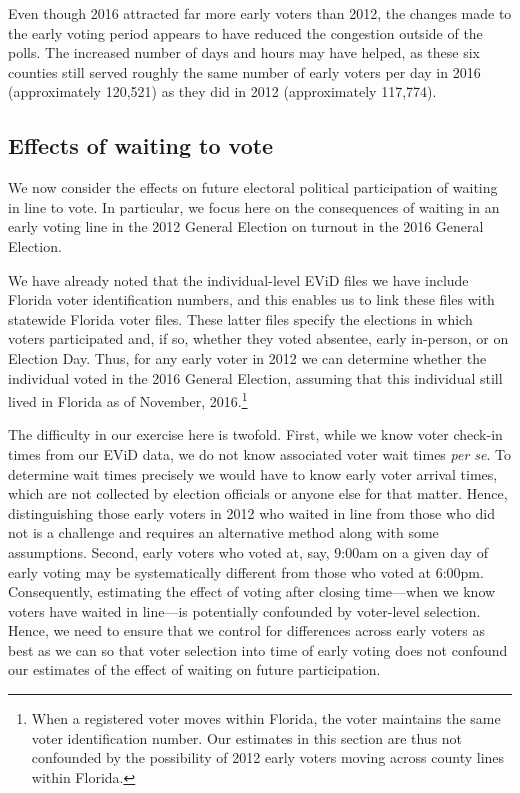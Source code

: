 \documentclass[12pt,titlepage]{article}
\begin{document}
Even though 2016 attracted far more early voters than 2012, the
changes made to the early voting period appears to have reduced the
congestion outside of the polls. The increased number of days and
hours may have helped, as these six counties still served roughly the
same number of early voters per day in 2016 (approximately 120,521) as
they did in 2012 (approximately 117,774). 





\subsection*{Effects of waiting to vote}

We now consider the effects on future electoral political
participation of waiting in line to vote.  In particular, we focus
here on the consequences of waiting in an early voting line in the
2012 General Election on turnout in the 2016 General Election.

We have already noted that the individual-level EViD files we have
include Florida voter identification numbers, and this enables us to
link these files with statewide Florida voter files.  These latter
files specify the elections in which voters participated and, if so,
whether they voted absentee, early in-person, or on Election Day.
Thus, for any early voter in 2012 we can determine whether the
individual voted in the 2016 General Election, assuming that this
individual still lived in Florida as of November, 2016.\footnote{When
  a registered voter moves within Florida, the voter maintains the
  same voter identification number.  Our estimates in this section are
  thus not confounded by the possibility of 2012 early voters moving
  across county lines within Florida.}

The difficulty in our exercise here is twofold.  First, while we know
voter check-in times from our EViD data, we do not know associated
voter wait times \emph{per se}.  To determine wait times precisely we
would have to know early voter arrival times, which are not collected
by election officials or anyone else for that matter.  Hence,
distinguishing those early voters in 2012 who waited in line from
those who did not is a challenge and requires an alternative method
along with some assumptions.  Second, early voters who voted at, say,
9:00am on a given day of early voting may be systematically different
from those who voted at 6:00pm. Consequently, estimating the effect of
voting after closing time---when we know voters have waited in
line---is potentially confounded by voter-level selection.  Hence, we
need to ensure that we control for differences across early voters as
best as we can so that voter selection into time of early voting does
not confound our estimates of the effect of waiting on future
participation.
\end{document}
